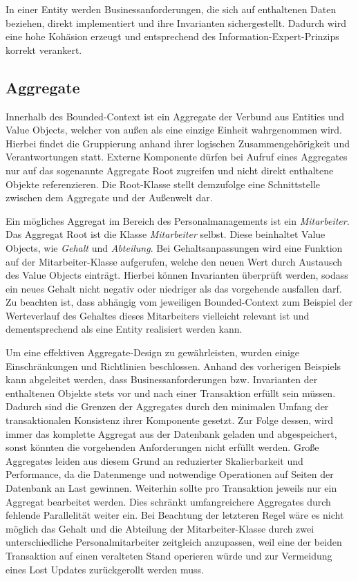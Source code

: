 In einer Entity werden Businessanforderungen, die sich auf enthaltenen Daten beziehen, direkt implementiert und ihre \Gls{Invariante}n sichergestellt. Dadurch wird eine hohe Kohäsion erzeugt und entsprechend des \Gls{Information-Expert-Prinzip}s korrekt verankert.

\subsection{Aggregate}

Innerhalb des Bounded-Context ist ein Aggregate der Verbund aus Entities und Value Objects, welcher von außen als eine einzige Einheit wahrgenommen wird. Hierbei findet die Gruppierung anhand ihrer logischen Zusammengehörigkeit und Verantwortungen statt. Externe Komponente dürfen bei Aufruf eines Aggregates nur auf das sogenannte Aggregate Root zugreifen und nicht direkt enthaltene Objekte referenzieren. Die Root-Klasse stellt demzufolge eine Schnittstelle zwischen dem Aggregate und der Außenwelt dar. 

Ein mögliches Aggregat im Bereich des Personalmanagements ist ein \emph{Mitarbeiter}. Das Aggregat Root ist die Klasse \emph{Mitarbeiter} selbst. Diese beinhaltet Value Objects, wie \emph{Gehalt} und \emph{Abteilung}. Bei Gehaltsanpassungen wird eine Funktion auf der Mitarbeiter-Klasse aufgerufen, welche den neuen Wert durch Austausch des Value Objects einträgt. Hierbei können Invarianten überprüft werden, sodass ein neues Gehalt nicht negativ oder niedriger als das vorgehende ausfallen darf. Zu beachten ist, dass abhängig vom jeweiligen Bounded-Context zum Beispiel der Werteverlauf des Gehaltes dieses Mitarbeiters vielleicht relevant ist und dementsprechend als eine Entity realisiert werden kann. 

Um eine effektiven Aggregate-Design zu gewährleisten, wurden einige Einschränkungen und Richtlinien beschlossen. Anhand des vorherigen Beispiels kann abgeleitet werden, dass Businessanforderungen bzw. Invarianten der enthaltenen Objekte stets vor und nach einer Transaktion erfüllt sein müssen. Dadurch sind die Grenzen der Aggregates durch den minimalen Umfang der transaktionalen Konsistenz ihrer Komponente gesetzt. Zur Folge dessen, wird immer das komplette Aggregat aus der Datenbank geladen und abgespeichert, sonst könnten die vorgehenden Anforderungen nicht erfüllt werden. Große Aggregates leiden aus diesem Grund an reduzierter Skalierbarkeit und Performance, da die Datenmenge und notwendige Operationen auf Seiten der Datenbank an Last gewinnen. Weiterhin sollte pro Transaktion jeweils nur ein Aggregat bearbeitet werden. Dies schränkt umfangreichere Aggregates durch fehlende Parallelität weiter ein. Bei Beachtung der letzteren Regel wäre es nicht möglich das Gehalt und die Abteilung der Mitarbeiter-Klasse durch zwei unterschiedliche Personalmitarbeiter zeitgleich anzupassen, weil eine der beiden Transaktion auf einen veralteten Stand operieren würde und zur Vermeidung eines \Gls{Lost Update}s zurückgerollt werden muss. 

